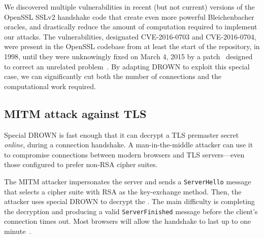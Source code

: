 \label{sec:special}

We discovered multiple vulnerabilities in recent
(but not current) versions of the OpenSSL SSLv2 handshake code that
create even more powerful Bleichenbacher oracles, and drastically reduce the amount
of computation required to implement our attacks.  
The vulnerabilities, designated CVE-2016-0703 and CVE-2016-0704, were
present in the OpenSSL codebase from at least the start of the repository,
in 1998, until they were unknowingly fixed on March 4, 2015 by a
patch~\cite{openssl-clear-patch} designed to correct an unrelated
problem~\cite{CVE-2015-0293}.
By adapting DROWN to exploit this special case, we can significantly cut both
the number of connections and the computational work required.






\subsection{MITM attack against TLS}
\label{sec:special_mitm_tls}

Special DROWN is fast enough that it can decrypt a TLS premaster
secret \emph{online}, during a connection handshake.  A
man-in-the-middle attacker can use it to compromise connections
between modern browsers and TLS servers---even those configured to
prefer non-RSA cipher suites.

The MITM attacker impersonates the server and sends a
\texttt{ServerHello} message that selects a cipher suite with RSA as
the key-exchange method.  Then, the attacker uses special DROWN to
decrypt the \pms.  The main difficulty is completing the decryption and producing a valid
\texttt{ServerFinished} message before the client's connection times
out.  Most browsers will allow the handshake to last up to one minute~\cite{LogJam}.

